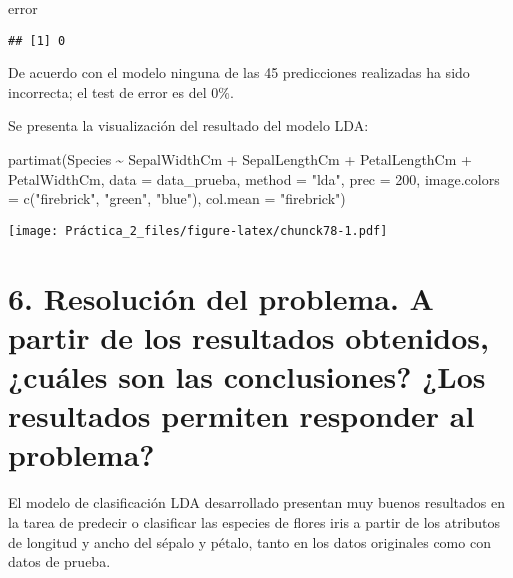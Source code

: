 \documentclass[
]{article}
\newenvironment{Shaded}{\begin{snugshade}}{\end{snugshade}}
\newcommand{\AttributeTok}[1]{\textcolor[rgb]{0.77,0.63,0.00}{#1}}
\newcommand{\DecValTok}[1]{\textcolor[rgb]{0.00,0.00,0.81}{#1}}
\newcommand{\FunctionTok}[1]{\textcolor[rgb]{0.00,0.00,0.00}{#1}}
\newcommand{\NormalTok}[1]{#1}
\newcommand{\SpecialCharTok}[1]{\textcolor[rgb]{0.00,0.00,0.00}{#1}}
\newcommand{\StringTok}[1]{\textcolor[rgb]{0.31,0.60,0.02}{#1}}
\begin{document}
\begin{Shaded}
\begin{Highlighting}[]
\NormalTok{error}
\end{Highlighting}
\end{Shaded}

\begin{verbatim}
## [1] 0
\end{verbatim}

De acuerdo con el modelo ninguna de las 45 predicciones realizadas ha
sido incorrecta; el test de error es del 0\%.

Se presenta la visualización del resultado del modelo LDA:

\begin{Shaded}
\begin{Highlighting}[]
\FunctionTok{partimat}\NormalTok{(Species }\SpecialCharTok{\textasciitilde{}}\NormalTok{ SepalWidthCm }\SpecialCharTok{+}\NormalTok{ SepalLengthCm }\SpecialCharTok{+}\NormalTok{ PetalLengthCm }\SpecialCharTok{+}\NormalTok{ PetalWidthCm,}
         \AttributeTok{data =}\NormalTok{ data\_prueba, }\AttributeTok{method =} \StringTok{"lda"}\NormalTok{, }\AttributeTok{prec =} \DecValTok{200}\NormalTok{,}
         \AttributeTok{image.colors =} \FunctionTok{c}\NormalTok{(}\StringTok{"firebrick"}\NormalTok{, }\StringTok{"green"}\NormalTok{, }\StringTok{"blue"}\NormalTok{),}
         \AttributeTok{col.mean =} \StringTok{"firebrick"}\NormalTok{)}
\end{Highlighting}
\end{Shaded}

\texttt{[image: Práctica\_2\_files/figure-latex/chunck78-1.pdf]}

\hypertarget{resoluciuxf3n-del-problema.-a-partir-de-los-resultados-obtenidos-cuuxe1les-son-las-conclusiones-los-resultados-permiten-responder-al-problema}{%
\section{6. Resolución del problema. A partir de los resultados
obtenidos, ¿cuáles son las conclusiones? ¿Los resultados permiten
responder al
problema?}\label{resoluciuxf3n-del-problema.-a-partir-de-los-resultados-obtenidos-cuuxe1les-son-las-conclusiones-los-resultados-permiten-responder-al-problema}}

El modelo de clasificación LDA desarrollado presentan muy buenos
resultados en la tarea de predecir o clasificar las especies de flores
iris a partir de los atributos de longitud y ancho del sépalo y pétalo,
tanto en los datos originales como con datos de prueba.
\end{document}

